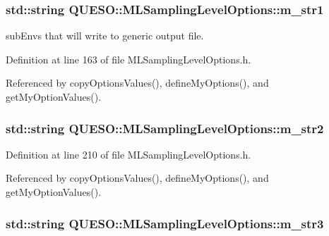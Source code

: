 \hypertarget{class_q_u_e_s_o_1_1_m_l_sampling_level_options_ac3586b30eb3e0f67e44074073bb157ff}{
\subsubsection[{m\-\_\-str1}]{\setlength{\rightskip}{0pt plus 5cm}std\-::string Q\-U\-E\-S\-O\-::\-M\-L\-Sampling\-Level\-Options\-::m\-\_\-str1}}\label{class_q_u_e_s_o_1_1_m_l_sampling_level_options_ac3586b30eb3e0f67e44074073bb157ff}


sub\-Envs that will write to generic output file. 



Definition at line 163 of file M\-L\-Sampling\-Level\-Options.\-h.



Referenced by copy\-Options\-Values(), define\-My\-Options(), and get\-My\-Option\-Values().

\hypertarget{class_q_u_e_s_o_1_1_m_l_sampling_level_options_ab91c7af5bfcfeb0466970713e2655e3a}{
\subsubsection[{m\-\_\-str2}]{\setlength{\rightskip}{0pt plus 5cm}std\-::string Q\-U\-E\-S\-O\-::\-M\-L\-Sampling\-Level\-Options\-::m\-\_\-str2}}\label{class_q_u_e_s_o_1_1_m_l_sampling_level_options_ab91c7af5bfcfeb0466970713e2655e3a}


Definition at line 210 of file M\-L\-Sampling\-Level\-Options.\-h.



Referenced by copy\-Options\-Values(), define\-My\-Options(), and get\-My\-Option\-Values().

\hypertarget{class_q_u_e_s_o_1_1_m_l_sampling_level_options_ab373068cdb371c781603dbb2b75ae14d}{
\subsubsection[{m\-\_\-str3}]{\setlength{\rightskip}{0pt plus 5cm}std\-::string Q\-U\-E\-S\-O\-::\-M\-L\-Sampling\-Level\-Options\-::m\-\_\-str3}}\label{class_q_u_e_s_o_1_1_m_l_sampling_level_options_ab373068cdb371c781603dbb2b75ae14d}


